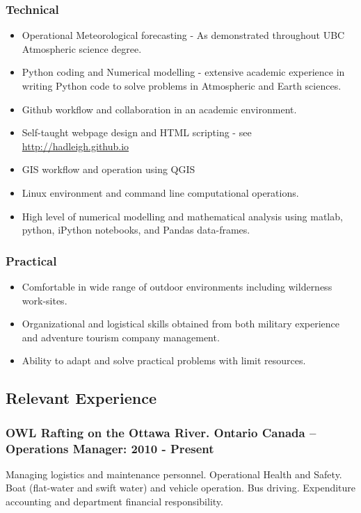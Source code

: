 \documentclass[]{article}
\begin{document}
\subsubsection*{Technical}
\begin{itemize}
\item Operational Meteorological forecasting - As demonstrated throughout UBC Atmospheric science degree.
\item Python coding and Numerical modelling - extensive academic experience in writing Python code to solve problems in Atmospheric and Earth sciences.
\item Github workflow and collaboration in an academic environment.
\item Self-taught webpage design and HTML scripting - see \url{http://hadleigh.github.io}
\item GIS workflow and operation using QGIS
\item Linux environment and command line computational operations.
\item High level of numerical modelling and mathematical analysis using matlab, python, iPython notebooks, and Pandas data-frames.
\end{itemize}
\subsubsection*{Practical}
\begin{itemize}
\item Comfortable in wide range of outdoor environments including wilderness work-sites. 
\item Organizational and logistical skills obtained from both military experience and adventure tourism company management.
\item Ability to adapt and solve practical problems with limit resources.
\end{itemize}

\subsection*{Relevant Experience}
\subsubsection*{OWL Rafting on the Ottawa River. Ontario Canada – Operations Manager: 2010 - Present}
Managing logistics and maintenance personnel. Operational Health and Safety. Boat (flat-water and swift water) and vehicle operation. Bus driving. Expenditure accounting and department financial responsibility.
\end{document}
